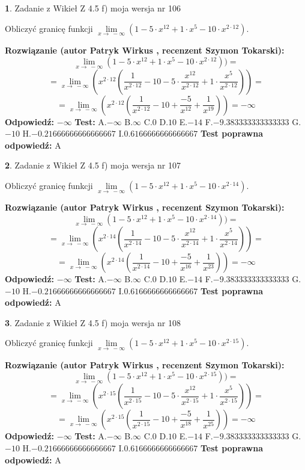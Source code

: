 \documentclass[12pt, a4paper]{article}
\theoremstyle{definition} %
\newtheorem{zad}{}
\newcommand{\zadStart}[1]{\begin{zad}#1\newline}
\newcommand{\zadStop}{\end{zad}}
\newcommand{\rozwStart}[2]{\noindent \textbf{Rozwiązanie (autor #1 , recenzent #2): }\newline}
\newcommand{\rozwStop}{\newline}
\newcommand{\odpStart}{\noindent \textbf{Odpowiedź:}\newline}
\newcommand{\odpStop}{\newline}
\newcommand{\testStart}{\noindent \textbf{Test:}\newline}
\newcommand{\testStop}{\newline}
\newcommand{\kluczStart}{\noindent \textbf{Test poprawna odpowiedź:}\newline}
\newcommand{\kluczStop}{\newline}
\begin{document}
\zadStart{Zadanie z Wikieł Z 4.5 f) moja wersja nr 106}


Obliczyć granicę funkcji  $\lim\limits_{x\to\ -\infty}(1 - 5 \cdot x^{12}+1 \cdot x^{5}- 10 \cdot x^{2\cdot12})$.
\zadStop
\rozwStart{Patryk Wirkus}{Szymon Tokarski}
$$\lim\limits_{x\to\ -\infty}(1 - 5 \cdot x^{12}+1 \cdot x^{5}- 10 \cdot x^{2\cdot12}))=$$
$$=\lim\limits_{x\to\ -\infty}(x^{2\cdot12}(\frac{1}{x^{2\cdot12}}-10 -5 \cdot \frac{x^{12}}{x^{2\cdot12}}+1 \cdot \frac{x^{5}}{x^{2\cdot12}}))=$$
$$=\lim\limits_{x\to\ -\infty}(x^{2\cdot12}(\frac{1}{x^{2\cdot12}}-10 + \frac{-5}{x^{12}}+ \frac{1}{x^{19}}))=-\infty$$
\rozwStop
\odpStart
$-\infty$
\odpStop
\testStart
A.$-\infty$ B.$\infty$ C.$0$ D.$10$ E.$-14$
F.$-9.383333333333333$ G.$-10$
H.$-0.21666666666666667$
I.$0.6166666666666667$
\testStop
\kluczStart
A
\kluczStop



\zadStart{Zadanie z Wikieł Z 4.5 f) moja wersja nr 107}


Obliczyć granicę funkcji  $\lim\limits_{x\to\ -\infty}(1 - 5 \cdot x^{12}+1 \cdot x^{5}- 10 \cdot x^{2\cdot14})$.
\zadStop
\rozwStart{Patryk Wirkus}{Szymon Tokarski}
$$\lim\limits_{x\to\ -\infty}(1 - 5 \cdot x^{12}+1 \cdot x^{5}- 10 \cdot x^{2\cdot14}))=$$
$$=\lim\limits_{x\to\ -\infty}(x^{2\cdot14}(\frac{1}{x^{2\cdot14}}-10 -5 \cdot \frac{x^{12}}{x^{2\cdot14}}+1 \cdot \frac{x^{5}}{x^{2\cdot14}}))=$$
$$=\lim\limits_{x\to\ -\infty}(x^{2\cdot14}(\frac{1}{x^{2\cdot14}}-10 + \frac{-5}{x^{16}}+ \frac{1}{x^{23}}))=-\infty$$
\rozwStop
\odpStart
$-\infty$
\odpStop
\testStart
A.$-\infty$ B.$\infty$ C.$0$ D.$10$ E.$-14$
F.$-9.383333333333333$ G.$-10$
H.$-0.21666666666666667$
I.$0.6166666666666667$
\testStop
\kluczStart
A
\kluczStop



\zadStart{Zadanie z Wikieł Z 4.5 f) moja wersja nr 108}


Obliczyć granicę funkcji  $\lim\limits_{x\to\ -\infty}(1 - 5 \cdot x^{12}+1 \cdot x^{5}- 10 \cdot x^{2\cdot15})$.
\zadStop
\rozwStart{Patryk Wirkus}{Szymon Tokarski}
$$\lim\limits_{x\to\ -\infty}(1 - 5 \cdot x^{12}+1 \cdot x^{5}- 10 \cdot x^{2\cdot15}))=$$
$$=\lim\limits_{x\to\ -\infty}(x^{2\cdot15}(\frac{1}{x^{2\cdot15}}-10 -5 \cdot \frac{x^{12}}{x^{2\cdot15}}+1 \cdot \frac{x^{5}}{x^{2\cdot15}}))=$$
$$=\lim\limits_{x\to\ -\infty}(x^{2\cdot15}(\frac{1}{x^{2\cdot15}}-10 + \frac{-5}{x^{18}}+ \frac{1}{x^{25}}))=-\infty$$
\rozwStop
\odpStart
$-\infty$
\odpStop
\testStart
A.$-\infty$ B.$\infty$ C.$0$ D.$10$ E.$-14$
F.$-9.383333333333333$ G.$-10$
H.$-0.21666666666666667$
I.$0.6166666666666667$
\testStop
\kluczStart
A
\kluczStop
\end{document}
